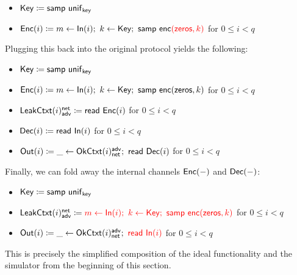 \begin{itemize}
\item $\mathsf{Key} \coloneqq \mathsf{samp} \ \mathsf{unif}_{\mathsf{key}}$
\item $\mathsf{Enc}(i) \coloneqq m \leftarrow \mathsf{In}(i); \ k \leftarrow \mathsf{Key}; \ \mathsf{samp} \ \mathsf{enc}{\color{red} (\mathsf{zeros},k)}$ for $0 \leq i < q$
\end{itemize}

\noindent Plugging this back into the original protocol yields the following:

\begin{itemize}
\item $\mathsf{Key} \coloneqq \mathsf{samp} \ \mathsf{unif}_{\mathsf{key}}$
\item $\mathsf{Enc}(i) \coloneqq m \leftarrow \mathsf{In}(i); \ k \leftarrow \mathsf{Key}; \ \mathsf{samp} \ \mathsf{enc}(\mathsf{zeros},k)$ for $0 \leq i < q$
\item $\mathsf{LeakCtxt}(i)^{\mathsf{net}}_{\mathsf{adv}} \coloneqq \mathsf{read} \ \mathsf{Enc}(i)$ for $0 \leq i < q$
\item $\mathsf{Dec}(i) \coloneqq \mathsf{read} \ \mathsf{In}(i)$ for $0 \leq i < q$
\item $\mathsf{Out}(i) \coloneqq \_ \leftarrow \mathsf{OkCtxt}(i)^{\mathsf{adv}}_{\mathsf{net}}; \ \mathsf{read} \ \mathsf{Dec}(i)$ for $0 \leq i < q$
\end{itemize}

\noindent Finally, we can fold away the internal channels $\mathsf{Enc}(-)$ and $\mathsf{Dec}(-)$:

\begin{itemize}
\item $\mathsf{Key} \coloneqq \mathsf{samp} \ \mathsf{unif}_{\mathsf{key}}$
\item $\LeakCtxt(i)^\net_\adv \coloneqq {\color{red} m \leftarrow \In(i); \ k \leftarrow \Key; \ \samp{\enc(\zeros,k)}}$ for $0 \leq i < q$
\item $\mathsf{Out}(i) \coloneqq \_ \leftarrow \mathsf{OkCtxt}(i)^{\mathsf{adv}}_{\mathsf{net}}; \ {\color{red} \mathsf{read} \ \mathsf{In}(i)}$ for $0 \leq i < q$
\end{itemize}

\noindent This is precisely the simplified composition of the ideal functionality and the simulator from the beginning of this section.